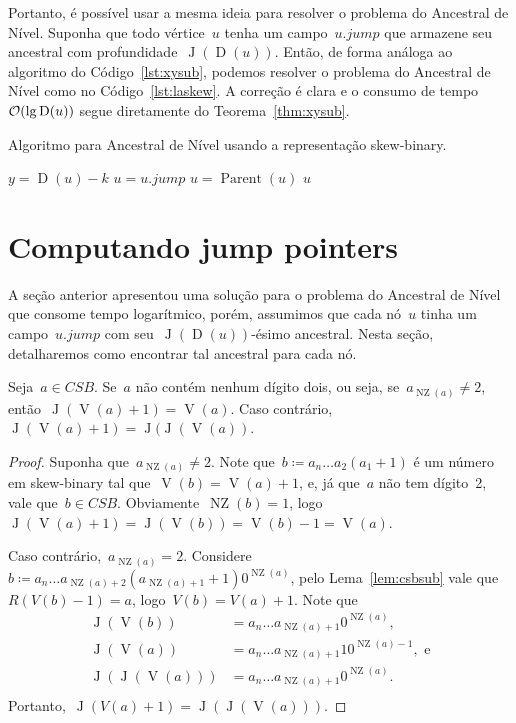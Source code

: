\documentclass[main.tex]{subfiles}
\newcommand{\Par}{\operatorname{Parent}}
\newcommand{\Dep}{\operatorname{D}}
\newcommand{\NZ}{\operatorname{NZ}}
\newcommand{\CSB}{\textit{CSB}}
\renewcommand{\V}{\operatorname{V}}
\newcommand{\J}{\operatorname{J}}
\begin{document}
\newcommand{\jmp}{\mathit{jump}}
Portanto, é possível usar a mesma ideia para resolver o problema do Ancestral de Nível. Suponha que todo vértice~$u$ tenha um campo~$u.\jmp$ que armazene seu ancestral com profundidade~$\J(\Dep(u))$. Então, de forma análoga ao algoritmo do Código~\ref{lst:xysub}, podemos resolver o problema do Ancestral de Nível como no Código~\ref{lst:laskew}. A correção é clara e o consumo de tempo~$\Oh(\lg\Dep(u))$ segue diretamente do Teorema~\ref{thm:xysub}.

\begin{algorithm}
\caption{Algoritmo para Ancestral de Nível usando a representação skew-binary.} \label{lst:laskew}
\begin{algorithmic}[1]
		\State $y = \Dep(u) - k$
		\While{$\Dep(u) \neq y$}
			\If{$\Dep(u.\jmp) \geq y$}
				\State $u = u.\jmp$
			\Else
				\State $u = \Par(u)$
			\EndIf
		\EndWhile
		\State \Return $u$
	\EndFunction
\end{algorithmic}
\end{algorithm}

\section{Computando jump pointers}

A seção anterior apresentou uma solução para o problema do Ancestral de Nível que consome tempo logarítmico, porém, assumimos que cada nó~$u$ tinha um campo~$u.\jmp$ com seu~$\J(\Dep(u))$-ésimo ancestral. Nesta seção, detalharemos como encontrar tal ancestral para cada nó.

\begin{theorem} \label{thm:csbj+1}
	Seja~$a \in \CSB$. Se~$a$ não contém nenhum dígito dois, ou seja, se~$a_{\NZ(a)} \neq 2$, então~$\J(\V(a) + 1) = \V(a)$. Caso contrário,~$\J(\V(a) + 1) = \J(\J(\V(a))$.
\end{theorem}
\begin{proof}
	Suponha que~$a_{\NZ(a)} \neq 2$. Note que~$b \coloneqq a_n \ldots a_2 (a_1 + 1)$ é um número em skew-binary tal que~${\V(b) = \V(a) + 1}$, e, já que~$a$ não tem dígito~2, vale que~${b \in \CSB}$. Obviamente~${\NZ(b) = 1}$, logo~${\J(\V(a) + 1) = \J(\V(b)) = \V(b) - 1 = \V(a)}$.

	Caso contrário,~${a_{\NZ(a)} = 2}$. Considere~${b \coloneqq a_n \ldots a_{\NZ(a) + 2} (a_{\NZ(a) + 1} + 1) 0^{\NZ(a)}}$, pelo Lema~\ref{lem:csbsub} vale que~${R(V(b) - 1) = a}$, logo~${V(b) = V(a) + 1}$. Note que \vspace{-2ex}
	\[
	\begin{array}{ll}
		\J(\V(b))     &= a_n \ldots a_{\NZ(a) + 1} 0^{\NZ(a)}, \\
		\J(\V(a))     &= a_n \ldots a_{\NZ(a) + 1} 10^{\NZ(a)-1},\text{ e} \\
		\J(\J(\V(a))) &= a_n \ldots a_{\NZ(a) + 1} 0^{\NZ(a)}. \\
	\end{array}
	\]
	Portanto,~$\J(V(a) + 1) = \J(\J(\V(a)))$.
\end{proof}
\end{document}
